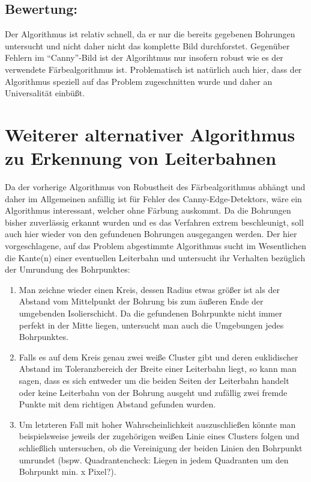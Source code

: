 \subsection{Bewertung:}
Der Algorithmus ist relativ schnell, da er nur die bereits gegebenen Bohrungen untersucht und nicht daher nicht das komplette Bild durchforstet. \newline
Gegenüber Fehlern im “Canny”-Bild ist der Algorihtmus nur insofern robust wie es der verwendete Färbealgorithmus ist. \newline
Problematisch ist natürlich auch hier, dass der Algorithmus speziell auf das Problem zugeschnitten wurde und daher an Universalität einbüßt.

\section{Weiterer alternativer Algorithmus zu Erkennung von Leiterbahnen}
Da der vorherige Algorithmus von Robustheit des Färbealgorithmus abhängt und daher im Allgemeinen anfällig ist für Fehler des Canny-Edge-Detektors, wäre ein Algorithmus interessant, welcher ohne Färbung auskommt. \newline
Da die Bohrungen bisher zuverlässig erkannt wurden und es das Verfahren extrem beschleunigt, soll auch hier wieder von den gefundenen Bohrungen ausgegangen werden. \newline
Der hier vorgeschlagene, auf das Problem abgestimmte Algorithmus sucht im Wesentlichen die Kante(n) einer eventuellen Leiterbahn und untersucht ihr Verhalten bezüglich der Umrundung des Bohrpunktes: \newline

\begin{enumerate}
\item Man zeichne wieder einen Kreis, dessen Radius etwas größer ist als der Abstand vom Mittelpunkt der Bohrung bis zum äußeren Ende der umgebenden Isolierschicht. \newline
Da die gefundenen Bohrpunkte nicht immer perfekt in der Mitte liegen, untersucht man auch die Umgebungen jedes Bohrpunktes.
\item Falls es auf dem Kreis genau zwei weiße Cluster gibt und deren euklidischer Abstand im Toleranzbereich der Breite einer Leiterbahn liegt, so kann man sagen, dass es sich entweder um die beiden Seiten der Leiterbahn handelt oder keine Leiterbahn von der Bohrung ausgeht und zufällig zwei fremde Punkte mit dem richtigen Abstand gefunden wurden.
\item Um letzteren Fall mit hoher Wahrscheinlichkeit auszuschließen könnte man beispielsweise jeweils der zugehörigen weißen Linie eines Clusters folgen und schließlich untersuchen, ob die Vereinigung der beiden Linien den Bohrpunkt umrundet (bspw. Quadrantencheck: Liegen in jedem Quadranten um den Bohrpunkt min. x Pixel?).
\end{enumerate}

